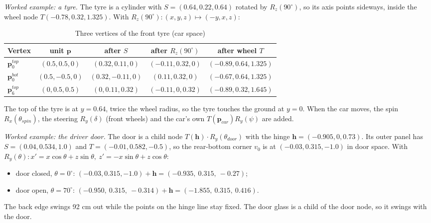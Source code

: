 \emph{Worked example: a tyre.} The tyre is a cylinder with $S=(0.64,0.22,0.64)$ rotated by $R_z(90^\circ)$, so its
axis points sideways, inside the wheel node $T(-0.78,0.32,1.325)$. With $R_z(90^\circ):(x,y,z)\mapsto(-y,x,z)$:
\begin{table}[H]
\centering\small
\caption{Three vertices of the front tyre (car space)}
\begin{tabular}{@{}l c c c c@{}}
\toprule
Vertex & unit $\mathbf{p}$ & after $S$ & after $R_z(90^\circ)$ & after wheel $T$ \\ \midrule
$\mathbf{p}_0^{top}$ & $(0.5,0.5,0)$ & $(0.32,0.11,0)$ & $(-0.11,0.32,0)$ & $(-0.89,0.64,1.325)$ \\
$\mathbf{p}_0^{bot}$ & $(0.5,-0.5,0)$ & $(0.32,-0.11,0)$ & $(0.11,0.32,0)$ & $(-0.67,0.64,1.325)$ \\
$\mathbf{p}_6^{top}$ & $(0,0.5,0.5)$ & $(0,0.11,0.32)$ & $(-0.11,0,0.32)$ & $(-0.89,0.32,1.645)$ \\
\bottomrule
\end{tabular}
\end{table}
The top of the tyre is at $y=0.64$, twice the wheel radius, so the tyre touches the ground at $y=0$. When the
car moves, the spin $R_x(\theta_{spin})$, the steering $R_y(\delta)$ (front wheels) and the car's own
$T(\mathbf{p}_{car})R_y(\psi)$ are added.

\emph{Worked example: the driver door.} The door is a child node $T(\mathbf{h})\cdot R_y(\theta_{door})$ with the
hinge $\mathbf{h}=(-0.905,0,0.73)$. Its outer panel has $S=(0.04,0.534,1.0)$ and $T=(-0.01,0.582,-0.5)$, so the
rear-bottom corner $v_0$ is at $(-0.03,0.315,-1.0)$ in door space. With
$R_y(\theta): x'=x\cos\theta+z\sin\theta,\ z'=-x\sin\theta+z\cos\theta$:
\begin{itemize}
  \item door closed, $\theta=0^\circ$: $(-0.03,0.315,-1.0)+\mathbf{h} = (-0.935,\ 0.315,\ -0.27)$;
  \item door open, $\theta=70^\circ$: $(-0.950,\ 0.315,\ -0.314)+\mathbf{h} = (-1.855,\ 0.315,\ 0.416)$.
\end{itemize}
The back edge swings 92 cm out while the points on the hinge line stay fixed. The door glass is a child of
the door node, so it swings with the door.

